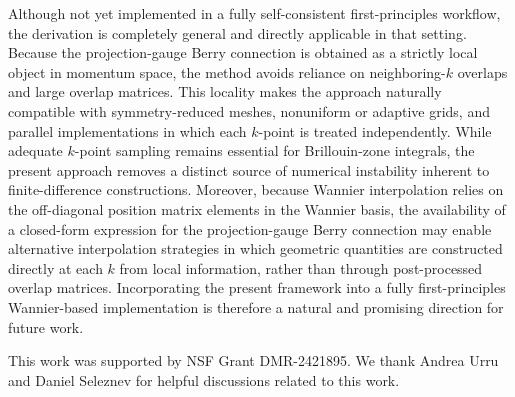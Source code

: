 \documentclass[galley,aps,pra,10pt,amsmath,amssymb,
    superscriptaddress,nofootinbib,longbibliography]{revtex4-2}
\begin{document}
Although not yet implemented in a fully self-consistent first-principles workflow, the derivation is completely general and directly applicable in that setting. Because the projection-gauge Berry connection is obtained as a strictly local object in momentum space, the method avoids reliance on neighboring-$k$ overlaps and large overlap matrices. This locality makes the approach naturally compatible with symmetry-reduced meshes, nonuniform or adaptive grids, and parallel implementations in which each $k$-point is treated independently. While adequate $k$-point sampling remains essential for Brillouin-zone integrals, the present approach removes a distinct source of numerical instability inherent to finite-difference constructions. Moreover, because Wannier interpolation relies on the off-diagonal position matrix elements in the Wannier basis, the availability of a closed-form expression for the projection-gauge Berry connection may enable alternative interpolation strategies in which geometric quantities are constructed directly at each $k$ from local information, rather than through post-processed overlap matrices. Incorporating the present framework into a fully first-principles Wannier-based implementation is therefore a natural and promising direction for future work.



\vspace{0.6cm}

\acknowledgments
This work was supported by NSF Grant DMR-2421895. We thank Andrea Urru and Daniel Seleznev for helpful discussions related to this work.

\appendix
\end{document}
